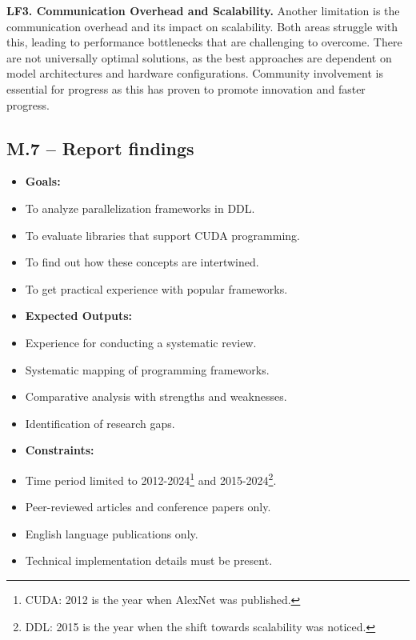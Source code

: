 \textbf{LF3. Communication Overhead and Scalability.}
Another limitation is the communication overhead and its impact on scalability. Both areas struggle
with this, leading to performance bottlenecks that are challenging to overcome. There are not universally
optimal solutions, as the best approaches are dependent on model architectures and hardware configurations.
Community involvement is essential for progress as this has proven to promote innovation and faster progress.

\subsection{M.7 -- Report findings}
\label{sec:study_selection_results}


\begin{itemize}
	\item \textbf{Goals:}
	\item To analyze parallelization frameworks in DDL.
	\item To evaluate libraries that support CUDA programming.
	\item To find out how these concepts are intertwined.
	\item To get practical experience with popular frameworks. \\
	\item \textbf{Expected Outputs:}
	\item Experience for conducting a systematic review.
	\item Systematic mapping of programming frameworks.
	\item Comparative analysis with strengths and weaknesses.
	\item Identification of research gaps. \\
	\item \textbf{Constraints:}
	\item Time period limited to 2012-2024\footnote{CUDA: 2012 is the year when AlexNet was published.} and
	      2015-2024\footnote{DDL: 2015 is the year when the shift towards scalability was noticed.}.
	\item Peer-reviewed articles and conference papers only.
	\item English language publications only.
	\item Technical implementation details must be present. \\
\end{itemize}

